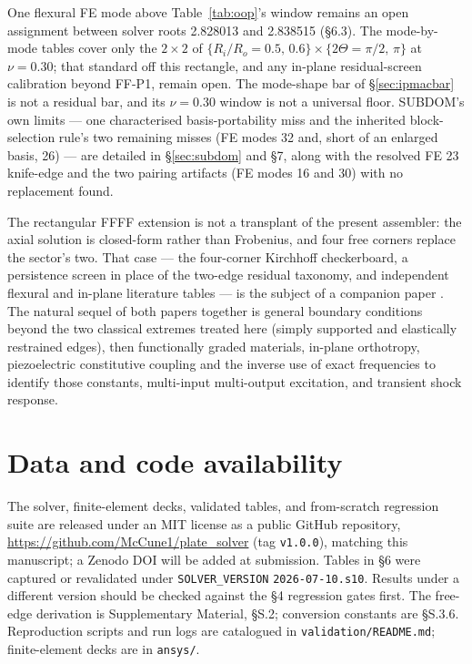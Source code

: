 \documentclass[11pt]{article}
\begin{document}
One flexural FE mode above Table~\ref{tab:oop}'s window remains an open
assignment between solver roots 2.828013 and 2.838515 (\S6.3). The
mode-by-mode tables cover only the $2\times2$ of
$\{R_i/R_o=0.5,\,0.6\}\times\{2\Theta=\pi/2,\,\pi\}$ at $\nu=0.30$; that
standard off this rectangle, and any in-plane residual-screen calibration
beyond FF-P1, remain open. The mode-shape bar of \S\ref{sec:ipmacbar} is
not a residual bar, and its $\nu=0.30$ window is not a universal floor.
SUBDOM's own limits --- one characterised basis-portability miss and the
inherited block-selection rule's two remaining misses (FE modes 32 and,
short of an enlarged basis, 26) --- are detailed in \S\ref{sec:subdom} and
\S7, along with the resolved FE 23 knife-edge and the two pairing
artifacts (FE modes 16 and 30) with no replacement found.

The rectangular FFFF extension is not a transplant of the present
assembler: the axial solution is closed-form rather than Frobenius, and
four free corners replace the sector's two. That case --- the
four-corner Kirchhoff checkerboard, a persistence screen in place of
the two-edge residual taxonomy, and independent flexural and in-plane
literature tables --- is the subject of a companion paper
\cite{mccune2026rect}. The natural sequel of both papers together is
general boundary conditions beyond the two classical extremes treated
here (simply supported and elastically restrained edges), then
functionally graded materials, in-plane orthotropy, piezoelectric
constitutive coupling and the inverse use of exact frequencies to
identify those constants, multi-input multi-output excitation, and
transient shock response.

\small
\section*{Data and code availability}
The solver, finite-element decks, validated tables, and from-scratch
regression suite are released under an MIT license as a public GitHub
repository, \url{https://github.com/McCune1/plate_solver} (tag
\texttt{v1.0.0}), matching this manuscript; a Zenodo DOI will be added at
submission. Tables in \S6 were captured or
revalidated under \texttt{SOLVER\_VERSION} \texttt{2026-07-10.s10}.
Results under a different version should be checked against the \S4
regression gates first. The free-edge derivation is Supplementary
Material, §S.2; conversion constants are §S.3.6. Reproduction scripts and run logs are catalogued in
\texttt{validation/README.md}; finite-element decks are in
\texttt{ansys/}.
\end{document}
